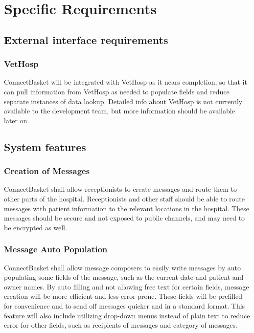 \documentclass[onecolumn, draftclsnofoot,10pt, compsoc]{IEEEtran}
\begin{document}
\section{Specific Requirements}

\subsection{External interface requirements}

\subsubsection{VetHosp}
ConnectBasket will be integrated with VetHosp as it nears completion, so that it can pull information from VetHosp as needed to populate fields and reduce separate instances of data lookup. Detailed info about VetHosp is not currently available to the development team, but more information should be available later on.

\subsection{System features}

\subsubsection{Creation of Messages}
ConnectBasket shall allow receptionists to create messages and route them to other parts of the hospital. Receptionists and other staff should be able to route messages with patient information to the relevant locations in the hospital. These messages should be secure and not exposed to public channels, and may need to be encrypted as well.

\subsubsection{Message Auto Population}
ConnectBasket shall allow message composers to easily write messages by auto populating some fields of the message, such as the current date and patient and owner names. By auto filling and not allowing free text for certain fields, message creation will be more efficient and less error-prone. These fields will be prefilled for convenience and to send off messages quicker and in a standard format. This feature will also include utilizing drop-down menus instead of plain text to reduce error for other fields, such as recipients of messages and category of messages.
\end{document}
